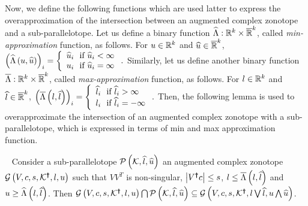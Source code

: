 Now, we define the following functions which are used latter to
express the overapproximation of the intersection between an augmented
complex zonotope and a sub-parallelotope.
%
Let us define a binary function
$\widehat{\Lambda}:\mathbb{R}^k\times\mathbb{\overline{R}}^k$,
called \emph{min-approximation} function, as follows.  For
$u\in\mathbb{R}^k$ and $\widehat{u}\in\mathbb{\overline{R}}^k$,
$\left(\widehat{\Lambda}\left(u,\widehat{u}\right)\right)_i = \left\{
\begin{array}{l}
\widehat{u}_i~~\text{if}~\widehat{u}_i<\infty\\
u_i~~\text{if}~\widehat{u}_i=\infty
\end{array}
\right..$
Similarly, let us define another binary function       
$\overline{\Lambda}:\mathbb{R}^k\times\mathbb{\overline{R}}^k$,
called \emph{max-approximation} function, as follows.  For
$l\in\mathbb{R}^k$ and $\widehat{l}\in\mathbb{\overline{R}}^k$,
$\left(\overline{\Lambda}\left(l,\widehat{l}\right)\right)_i = \left\{
\begin{array}{l}
\widehat{l}_i~~\text{if}~\widehat{l}_i>\infty\\
l_i~~\text{if}~\widehat{l}_i=-\infty
\end{array}
\right..$
%
Then, the following lemma is used to overapproximate the intersection
of an augmented complex zonotope with a sub-parallelotope, which is
expressed in terms of min and max approximation function.
\begin{theorem}~\label{lem:acz-int}
Consider a sub-parallelotope $\mathcal{P}\left(\mathcal{K},\widehat{l},\widehat{u}\right)$ an
augmented complex zonotope $\mathcal{G}\left(V,c,s,\mathcal{K}^{\bm{\dagger}},l,u\right)$
such that $VV^T$ is non-singular, $\left|V^{\bm{\dagger}}c\right|\leq s$, $l\leq
\overline{\Lambda}\left(l,\widehat{l}\right)$ and $u\geq \widehat{\Lambda}\left(l,\widehat{l}\right)$.  Then
$\mathcal{G}\left(V,c,s,\mathcal{K}^{\bm{\dagger}},l,u\right)\bigcap\mathcal{P}\left(\mathcal{K},\widehat{l},\widehat{u}\right)\subseteq
\mathcal{G}\left(V,c,s,\mathcal{K}^{\bm{\dagger}},l\bigvee\widehat{l},u\bigwedge\widehat{u}\right)$.
\end{theorem}
